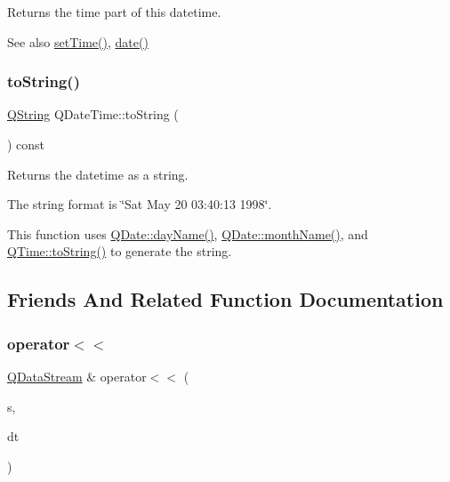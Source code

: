 Returns the time part of this datetime.

\begin{DoxySeeAlso}{See also}
\mbox{\hyperlink{class_q_date_time_a6384cf8a49551d5e42786ab850894813}{set\+Time()}}, \mbox{\hyperlink{class_q_date_time_ae7d86dc9b95e2aeab38391033eeff9eb}{date()}} 
\end{DoxySeeAlso}
\mbox{\label{class_q_date_time_a5455d25292813109f21c15888552c5c9}} 
\subsubsection{\texorpdfstring{toString()}{toString()}}
{\footnotesize\ttfamily \mbox{\hyperlink{class_q_string}{Q\+String}} Q\+Date\+Time\+::to\+String (\begin{DoxyParamCaption}{ }\end{DoxyParamCaption}) const}

Returns the datetime as a string.

The string format is \char`\"{}\+Sat May 20 03\+:40\+:13 1998\char`\"{}.

This function uses \mbox{\hyperlink{class_q_date_a08320176a833c05ff718155da1177381}{Q\+Date\+::day\+Name()}}, \mbox{\hyperlink{class_q_date_afa5fcbf8ec6629175873dd50cbc3da4c}{Q\+Date\+::month\+Name()}}, and \mbox{\hyperlink{class_q_time_a87ef6af883b329327e1665cc639d403c}{Q\+Time\+::to\+String()}} to generate the string. 

\subsection{Friends And Related Function Documentation}
\mbox{\label{class_q_date_time_ac4f6ae497406f297a47183ecc265816a}} 
\subsubsection{\texorpdfstring{operator$<$$<$}{operator<<}}
{\footnotesize\ttfamily \mbox{\hyperlink{class_q_data_stream}{Q\+Data\+Stream}} \& operator$<$$<$ (\begin{DoxyParamCaption}\item[{\mbox{\hyperlink{class_q_data_stream}{Q\+Data\+Stream}} \&}]{s,  }\item[{const \mbox{\hyperlink{class_q_date_time}{Q\+Date\+Time}} \&}]{dt }\end{DoxyParamCaption})\hspace{0.3cm}{\ttfamily [friend]}}

